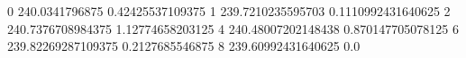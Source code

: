 0 240.0341796875 0.42425537109375
1 239.7210235595703 0.1110992431640625
2 240.7376708984375 1.12774658203125
4 240.48007202148438 0.870147705078125
6 239.82269287109375 0.2127685546875
8 239.60992431640625 0.0
